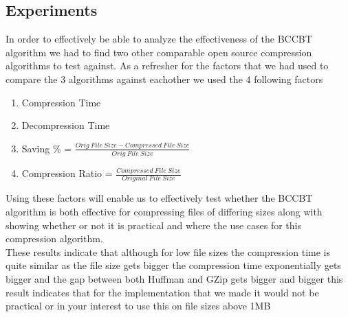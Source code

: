 \documentclass[12pt]{IEEEtran}
\begin{document}
\subsection{Experiments}
In order to effectively be able to analyze the effectiveness of the BCCBT algorithm we had to 
find two other comparable open source compression algorithms to test against.  As a refresher for 
the factors that we had used to compare the 3 algorithms against eachother we used the 4 following
factors
\begin{enumerate}
	\item Compression Time
	\item Decompression Time
    \item Saving \% = $\frac{Orig\ File\ Size - Compressed\ File\ Size}{Orig\ File\ Size}$
    \item Compression Ratio = $\frac{Compressed\ File\ Size}{Original\ File\ Size}$
\end{enumerate}
Using these factors will enable us to effectively test whether the BCCBT algorithm is both effective 
for compressing files of differing sizes along with showing whether or not it is practical and
where the use cases for this compression algorithm.
\\
These results indicate that although for low file sizes the compression time is quite similar
as the file size gets bigger the compression time exponentially gets bigger and the gap between
both Huffman and GZip gets bigger and bigger this result indicates that for the implementation
that we made it would not be practical or in your interest to use this on file sizes above 1MB
\end{document}
